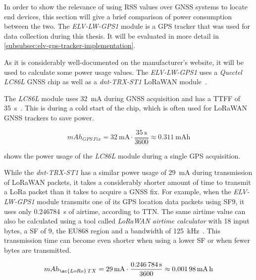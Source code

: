 In order to show the relevance of using \ac{RSS} values over \ac{GNSS} systems to locate end devices, this section will give a brief comparison of power consumption between the two.
The \emph{ELV-LW-GPS1} module is a \ac{GPS} tracker that was used for data collection during this thesis.
It will be evaluated in more detail in \cref{subsubsec:elv-gps-tracker-implementation}.

As it is considerably well-documented on the manufacturer's website, it will be used to calculate some power usage values.
The \emph{ELV-LW-GPS1} uses a \emph{Quectel LC86L} \ac{GNSS} chip as well as a \emph{dnt-TRX-ST1} \ac{LoRaWAN} module~\cite{elv_elektronik_ag_elv_2023}.

The \emph{LC86L} module uses \SI{32}{\milli\ampere} during \ac{GNSS} acquisition and has a \ac{TTFF} of \SI{35}{\second}~\cite{quectel_gnss_nodate}.
This is during a cold start of the chip, which is often used for \ac{LoRaWAN} \ac{GNSS} trackers to save power.

\begin{equation}\label{eq:LC86L-fix-consumption}
    mAh_{GPS\,Fix} = \SI{32}{\milli\ampere} \cdot \frac{\SI{35}{\second}}{3600} \approx \SI{0.311}{\milli\ampere\hour}
\end{equation}

 shows the power usage of the \emph{LC86L} module during a single \ac{GPS} acquisition.

While the \emph{dnt-TRX-ST1} has a similar power usage of \SI{29}{\milli\ampere} during transmission of \ac{LoRaWAN} packets, it takes a considerably shorter amount of time to transmit a \ac{LoRa} packet than it takes to acquire a \ac{GNSS} fix.
For example, when the \emph{ELV-LW-GPS1} module transmits one of its \ac{GPS} location data packets using \ac{SF}9, it uses only \SI{0.246784}{\second} of airtime, according to \ac{TTN}.
The same airtime value can also be calculated using a tool called \emph{\ac{LoRaWAN} airtime calculator} with 18 input bytes, a \ac{SF} of 9, the EU868 region and a bandwidth of \SI{125}{\kilo\hertz}~\cite{the_things_network_lorawan_nodate}.
This transmission time can become even shorter when using a lower \ac{SF} or when fewer bytes are transmitted.

\begin{equation}\label{eq:dnt-TRX-ST1-tx-consumption}
    mAh_{\ac{LoRa}\,TX} = \SI{29}{\milli\ampere} \cdot \frac{\SI{0.246784}{\second}}{3600} \approx \SI{0.00198}{\milli\ampere\hour}
\end{equation}

